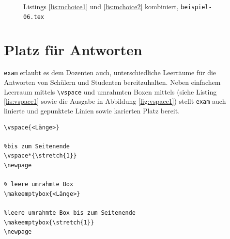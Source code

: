 \begin{figure}
\caption{Listings \ref{lis:mchoice1} und \ref{lis:mchoice2} kombiniert, \texttt{beispiel-06.tex}}\label{fig:mchoicea}
\end{figure}

\clearpage

\section{Platz für Antworten}

\texttt{exam} erlaubt es dem Dozenten auch, unterschiedliche Leerräume für die Antworten von Schülern und Studenten bereitzuhalten. 
Neben einfachem Leerraum mittels \texttt{\textbackslash vspace} und umrahmten Boxen mittels (siehe Listing \ref{lis:vspace1} sowie die Ausgabe in Abbildung \ref{fig:vspace1}) stellt \texttt{exam} auch linierte und gepunktete Linien sowie karierten Platz bereit.

\begin{lstlisting}[caption={Leerraum und Boxen für Antworten}, label={lis:vspace1}]
% einfacher Abstand
\vspace{<Länge>}

%bis zum Seitenende
\vspace*{\stretch{1}}
\newpage

% leere umrahmte Box
\makeemptybox{<Länge>}

%leere umrahmte Box bis zum Seitenende
\makeemptybox{\stretch{1}}
\newpage
\end{lstlisting}

